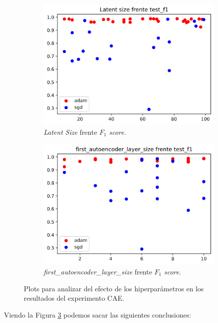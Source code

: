 \begin{figure}[H]
\begin{subfigure}{.5\textwidth}
  \centering
  \includegraphics[width=.8\linewidth]{imagenes/06_Experimentacion/caeimages/caelatentsize.png}
  \caption{\textit{Latent Size} frente \textit{$F_1$ score}.}
  \label{fig:caelatentsize}
\end{subfigure}
\begin{subfigure}{.5\textwidth}
  \centering
  \includegraphics[width=.8\linewidth]{imagenes/06_Experimentacion/caeimages/caefcoc.png}  
  \caption{\textit{first\_autoencoder\_layer\_size} frente \textit{$F_1$ score}.}
  \label{fig:caefcoc}
\end{subfigure}

\caption{Plots para analizar del efecto de los hiperparámetros en los resultados del experimento CAE.}
\label{fig:caeanalysis}
\end{figure}

Viendo la Figura \ref{fig:caeanalysis} podemos sacar las siguientes conclusiones:

